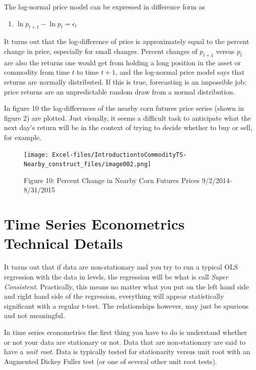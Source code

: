 \documentclass[
  letterpaper,
  DIV=11,
  numbers=noendperiod]{scrreprt}
\providecommand{\tightlist}{%
  \setlength{\itemsep}{0pt}\setlength{\parskip}{0pt}}\usepackage{longtable,booktabs,array}
\begin{document}
The log-normal price model can be expressed in difference form as

\begin{enumerate}
\def\labelenumi{(\arabic{enumi})}
\setcounter{enumi}{6}
\tightlist
\item
  \(\ln{p_{t+1}} - \ln{p_{t}} = \epsilon_t\)
\end{enumerate}

It turns out that the log-difference of price is approximately equal to
the percent change in price, especially for small changes. Percent
changes of \(p_{t+1}\) versus \(p_t\) are also the returns one would get
from holding a long position in the asset or commodity from time \(t\)
to time \(t+1\), and the log-normal price model says that returns are
normally distributed. If this is true, forecasting is an impossible job;
price returns are an unpredictable random draw from a normal
distribution.

In figure 10 the log-differences of the nearby corn futures price series
(shown in figure 2) are plotted. Just visually, it seems a difficult
task to anticipate what the next day's return will be in the context of
trying to decide whether to buy or sell, for example.

\begin{figure}[H]

{\centering \texttt{[image: Excel-files/IntroductiontoCommodityTS-Nearby\_construct\_files/image002.png]}

}

\caption{Figure 10: Percent Change in Nearby Corn Futures Prices
9/2/2014-8/31/2015}

\end{figure}%

\section{Time Series Econometrics Technical
Details}\label{time-series-econometrics-technical-details}

It turns out that if data are non-stationary and you try to run a
typical OLS regression with the data in levels, the regression will be
what is call \emph{Super Consistent}. Practically, this means no matter
what you put on the left hand side and right hand side of the
regression, everything will appear statistically significant with a
regular t-test. The relationships however, may just be spurious and not
meaningful.

In time series econometrics the first thing you have to do is understand
whether or not your data are stationary or not. Data that are
non-stationary are said to have a \emph{unit root}. Data is typically
tested for stationarity versus unit root with an Augmented Dickey Fuller
test (or one of several other unit root tests).
\end{document}
